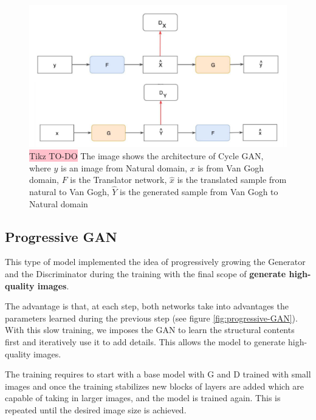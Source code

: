 \begin{figure}[!htbp]
    \centering
    \includegraphics[width=\linewidth]{tikz/Cycle GAN.png}
    \caption{{\color{red}\colorbox{pink}{Tikz TO-DO}} The image shows the architecture of Cycle GAN, where $y$ is an image from Natural domain, $x$ is from Van Gogh domain, $F$ is the Translator network, $\hat{x}$ is the translated sample from natural to Van Gogh, $\hat{Y}$ is the generated sample from Van Gogh to Natural domain}
    \label{fig:cycle-GAN}
\end{figure}

\subsection{Progressive GAN}

This type of model implemented the idea of progressively growing the Generator and the Discriminator during the training with the final scope of \textbf{generate high-quality images}.

The advantage is that, at each step, both networks take into advantages the parameters learned during the previous step (see figure \ref{fig:progressive-GAN}). With this slow training, we imposes the GAN to learn the structural contents first and iteratively  use it to add details. This allows the model to generate high-quality images.


The training requires to start with a base model with G and D trained with small images and once the training stabilizes new blocks of layers are added which are capable of taking in larger images, and the model is trained again. This is repeated until the desired image size is achieved.

